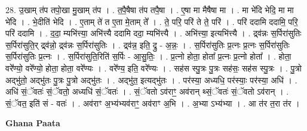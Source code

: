 \documentclass[17pt]{extarticle}
\begin{document}
28. उ॒खाम् त॑प तपो॒खा मु॒खाम् त॑प । . त॒पै॒षैषा त॑प तपै॒षा । . ए॒षा मा मैषैषा मा । . मा भे॑दि भेदि॒ मा मा भे॑दि । . भे॒दीति॑ भेदि । . ए॒ताम् ते॑ त ए॒ता मे॒ताम् ते᳚ । . ते॒ परि॒ परि॑ ते ते॒ परि॑ । . परि॑ ददामि ददामि॒ परि॒ परि॑ ददामि । . द॒दा॒ म्यभि॑त्त्या॒ अभि॑त्त्यै ददामि ददा॒ म्यभि॑त्त्यै । . अभि॑त्त्या॒ इत्यभि॑त्त्यै । . द्र्व॑न्नः स॒र्पिरा॑सुतिः स॒र्पिरा॑सुति॒र् द्र्व॑न्नो॒ द्र्व॑न्नः स॒र्पिरा॑सुतिः । . द्र्व॑न्न॒ इति॒ द्रु - अ॒न्नः॒ । . स॒र्पिरा॑सुतिः प्र॒त्नः प्र॒त्नः स॒र्पिरा॑सुतिः स॒र्पिरा॑सुतिः प्र॒त्नः । . स॒र्पिरा॑सुति॒रिति॑ स॒र्पिः - आ॒सु॒तिः॒ । . प्र॒त्नो होता॒ होता᳚ प्र॒त्नः प्र॒त्नो होता᳚ । . होता॒ वरे᳚ण्यो॒ वरे᳚ण्यो॒ होता॒ होता॒ वरे᳚ण्यः । . वरे᳚ण्य॒ इति॒ वरे᳚ण्यः । . सह॑स स्पु॒त्रः पु॒त्रः सह॑सः॒ सह॑स स्पु॒त्रः । . पु॒त्रो अद्भु॑तो॒ अद्भु॑तः पु॒त्रः पु॒त्रो अद्भु॑तः । . अद्भु॑त॒ इत्यद्भु॑तः । . पर॑स्या॒ अध्यधि॒ पर॑स्याः॒ पर॑स्या॒ अधि॑ । . अधि॑ सं॒ॅवतः॑ सं॒ॅवतो॒ अध्यधि॑ सं॒ॅवतः॑ । . सं॒ॅवतो ऽव॑राꣳ॒॒ अव॑रान् थ्सं॒ॅवतः॑ सं॒ॅवतो ऽव॑रान् । . सं॒ॅवत॒ इति॑ सं - वतः॑ । . अव॑राꣳ अ॒भ्य॑भ्यव॑राꣳ॒॒ अव॑राꣳ अ॒भि । . अ॒भ्या ऽभ्य॑भ्या । . आ त॑र त॒रा त॑र । \newline

\textbf{Ghana Paata } \newline
\end{document}
